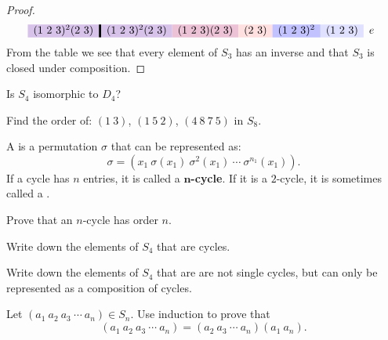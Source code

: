 \documentclass{ximera}
\begin{document}
\begin{example}
\begin{proof}
\begin{gather*}
\begin{array}{c!{\vline width 2pt}cccccc}
        (1\ 2\ 3)^2 (2\ 3)\cellcolor{blue!66!red!24!white}      & (1\ 2\ 3)^2 (2\ 3)\cellcolor{blue!66!red!24!white} & (1\ 2\ 3)(2\ 3) \cellcolor{blue!33!red!24!white}    & (2\ 3) \cellcolor{red!12!white}   & (1\ 2\ 3)^2\cellcolor{blue!24!white}    & (1\ 2\ 3)\cellcolor{blue!12!white}   & e     \\  
      \end{array}
    \end{gather*}
    From the table we see that every element of $S_3$ has an inverse
    and that $S_3$ is closed under composition.
  \end{proof}
\end{example}

\begin{exercise}
  Is $S_4$ isomorphic to $D_4$?
\end{exercise}


\begin{exercise}
  Find the order of: $(1 \ 3)$, $(1 \ 5 \ 2)$, $(4 \ 8 \ 7 \ 5)$ in
  $S_8$.
\end{exercise}



\begin{definition}
  A  is a permutation $\sigma$ that can be represented as:
  \[
  \sigma = (x_1\ \sigma(x_1)\ \sigma^2(x_1)\ \cdots\ \sigma^{n_1}(x_1)) .
  \]
  If a cycle has $n$ entries, it is called a
  $\boldsymbol{n}$\textbf{-cycle}. If it is a $2$-cycle, it is
  sometimes called a .
\end{definition}



\begin{exercise}
  Prove that an $n$-cycle has order $n$.
\end{exercise}



\begin{exercise}
  Write down the elements of $S_4$ that are cycles. 
\end{exercise}

\begin{exercise}
  Write down the elements of $S_4$ that are are not single cycles, but
  can only be represented as a composition of cycles.
\end{exercise}


\begin{exercise}
  Let $(a_1 \ a_2 \ a_3 \ \cdots \ a_{n})\in S_n$. Use induction to
  prove that
  \[
  (a_1 \ a_2 \ a_3 \ \cdots \ a_{n}) = (a_2 \ a_3 \ \cdots \ a_{n}) (a_1 \ a_{n}). 
  \]
\end{exercise}
\end{document}
